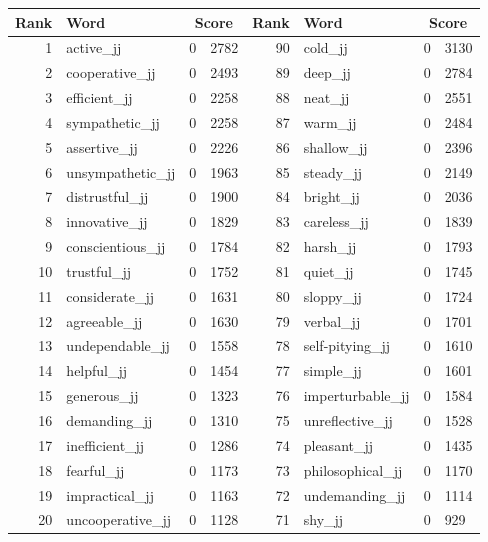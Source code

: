 \begin{table}[tbp]
    \begin{tabular}{| rlr@{.}l | rlr@{.}l |}
    \hline
    \textbf{Rank} & \textbf{Word} & \multicolumn{2}{c|}{\textbf{Score}} & \textbf{Rank} & \textbf{Word} & \multicolumn{2}{c|}{\textbf{Score}} \\
    \hline
    1 & active\_jj & 0 & 2782    &    90 & cold\_jj & 0 & 3130 \\
    2 & cooperative\_jj & 0 & 2493    &    89 & deep\_jj & 0 & 2784 \\
    3 & efficient\_jj & 0 & 2258    &    88 & neat\_jj & 0 & 2551 \\
    4 & sympathetic\_jj & 0 & 2258    &    87 & warm\_jj & 0 & 2484 \\
    5 & assertive\_jj & 0 & 2226    &    86 & shallow\_jj & 0 & 2396 \\
    6 & unsympathetic\_jj & 0 & 1963    &    85 & steady\_jj & 0 & 2149 \\
    7 & distrustful\_jj & 0 & 1900    &    84 & bright\_jj & 0 & 2036 \\
    8 & innovative\_jj & 0 & 1829    &    83 & careless\_jj & 0 & 1839 \\
    9 & conscientious\_jj & 0 & 1784    &    82 & harsh\_jj & 0 & 1793 \\
    10 & trustful\_jj & 0 & 1752    &    81 & quiet\_jj & 0 & 1745 \\
    11 & considerate\_jj & 0 & 1631    &    80 & sloppy\_jj & 0 & 1724 \\
    12 & agreeable\_jj & 0 & 1630    &    79 & verbal\_jj & 0 & 1701 \\
    13 & undependable\_jj & 0 & 1558    &    78 & self-pitying\_jj & 0 & 1610 \\
    14 & helpful\_jj & 0 & 1454    &    77 & simple\_jj & 0 & 1601 \\
    15 & generous\_jj & 0 & 1323    &    76 & imperturbable\_jj & 0 & 1584 \\
    16 & demanding\_jj & 0 & 1310    &    75 & unreflective\_jj & 0 & 1528 \\
    17 & inefficient\_jj & 0 & 1286    &    74 & pleasant\_jj & 0 & 1435 \\
    18 & fearful\_jj & 0 & 1173    &    73 & philosophical\_jj & 0 & 1170 \\
    19 & impractical\_jj & 0 & 1163    &    72 & undemanding\_jj & 0 & 1114 \\
    20 & uncooperative\_jj & 0 & 1128    &    71 & shy\_jj & 0 & 929 \\

\end{tabular}
\end{table}
